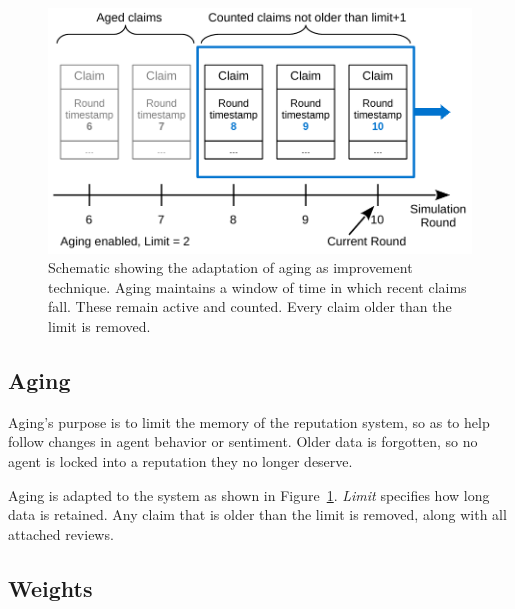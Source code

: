 \documentclass[%
    ]{\PathToTumTemplate/thesis/tum_thesis}
\begin{document}
\begin{figure}[tbp]
  \begin{center}
        \includegraphics[width=0.85\linewidth]	{../images/improvement_aging-crop.pdf}
    \caption{
    Schematic showing the adaptation of aging as improvement technique.
    Aging maintains a window of time in which recent claims fall.
    These remain active and counted.
    Every claim older than the limit is removed.
    }
    \label{fig:improvement_aging}
  \end{center}
\end{figure}

\subsection{Aging}

Aging's purpose is to limit the memory of the reputation system, so as to help follow changes in agent behavior or sentiment.
Older data is forgotten, so no agent is locked into a reputation they no longer deserve.

Aging is adapted to the system as shown in Figure~\ref{fig:improvement_aging}.
\emph{Limit} specifies how long data is retained.
Any claim that is older than the limit is removed, along with all attached reviews.


\subsection{Weights}
\end{document}

